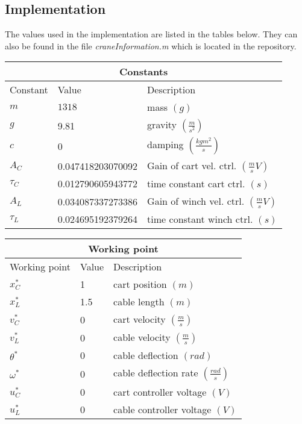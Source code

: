 \documentclass[12pt]{article}
\begin{document}
\subsection{Implementation}
The values used in the implementation are listed in the tables below. They can also be found in the file \emph{craneInformation.m} which is located in the repository.
\begin{table}[!ht]
\centering
\begin{tabular}{| l | l | l |}
\hline
\multicolumn{3}{|c|}{\textbf{Constants}} \\
\hline
Constant & Value & Description \\
\hline 
$m$   &    $1318$ & mass $(g)$ \\
$g$   &    9.81 & gravity $(\frac{m}{s^2})$ \\
$c$   &    0    &             damping $(\frac{kgm^2}{s})$ \\
$A_C$ &    0.047418203070092 & Gain of cart vel. ctrl. $(\frac{m}{s}V)$ \\
$\tau_C$ & 0.012790605943772 & time constant cart ctrl. $(s)$ \\
$A_L$ &    0.034087337273386 & Gain of winch vel. ctrl. $(\frac{m}{s}V)$ \\
$\tau_L$ & 0.024695192379264 & time constant winch ctrl. $(s)$ \\
\hline
\end{tabular}
\end{table}

\begin{table}[!ht]
\centering
\begin{tabular}{| l | l | l |}
\hline
\multicolumn{3}{|c|}{\textbf{Working point}} \\
\hline
Working point & Value & Description \\
\hline 
$x_C^*$ & 1    & cart position $(m)$ \\
$x_L^*$ & 1.5  & cable length $(m)$ \\
$v_C^*$ & 0    & cart velocity $(\frac{m}{s})$ \\
$v_L^*$ & 0    & cable velocity $(\frac{m}{s})$ \\
$\theta^*$ & 0 & cable deflection $(rad)$ \\
$\omega^*$ & 0 & cable deflection rate $(\frac{rad}{s})$ \\
$u_C^*$ & 0 & cart controller voltage $(V)$ \\
$u_L^*$ & 0 & cable controller voltage $(V)$ \\
\hline
\end{tabular}
\end{table}
\end{document}
